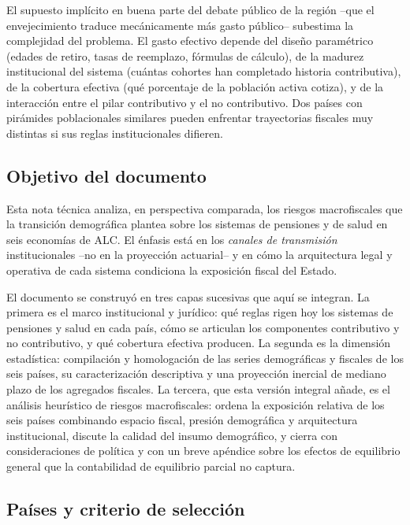 \documentclass[12pt, letterpaper]{article}
\begin{document}
El supuesto implícito en buena parte del debate público de la región --que el
envejecimiento traduce mecánicamente más gasto público-- subestima la complejidad
del problema. El gasto efectivo depende del diseño paramétrico (edades de retiro,
tasas de reemplazo, fórmulas de cálculo), de la madurez institucional del sistema
(cuántas cohortes han completado historia contributiva), de la cobertura efectiva
(qué porcentaje de la población activa cotiza), y de la interacción entre el pilar
contributivo y el no contributivo. Dos países con pirámides poblacionales similares
pueden enfrentar trayectorias fiscales muy distintas si sus reglas institucionales
difieren.

\subsection{Objetivo del documento}

Esta nota técnica analiza, en perspectiva comparada, los riesgos macrofiscales que
la transición demográfica plantea sobre los sistemas de pensiones y de salud en seis
economías de ALC. El énfasis está en los \textit{canales de transmisión}
institucionales --no en la proyección actuarial-- y en cómo la arquitectura legal y
operativa de cada sistema condiciona la exposición fiscal del Estado.

El documento se construyó en tres capas sucesivas que aquí se integran. La primera
es el marco institucional y jurídico: qué reglas rigen hoy los sistemas de
pensiones y salud en cada país, cómo se articulan los componentes contributivo y no
contributivo, y qué cobertura efectiva producen. La segunda es la dimensión
estadística: compilación y homologación de las series demográficas y fiscales de
los seis países, su caracterización descriptiva y una proyección inercial de
mediano plazo de los agregados fiscales. La tercera, que esta versión integral
añade, es el análisis heurístico de riesgos macrofiscales: ordena la exposición
relativa de los seis países combinando espacio fiscal, presión demográfica y
arquitectura institucional, discute la calidad del insumo demográfico, y cierra con
consideraciones de política y con un breve apéndice sobre los efectos de equilibrio
general que la contabilidad de equilibrio parcial no captura.

\subsection{Países y criterio de selección}
\end{document}
